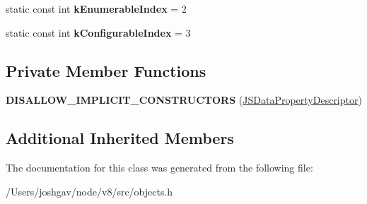 \begin{DoxyCompactItemize}
\item 
static const int {\bfseries k\+Enumerable\+Index} = 2\hypertarget{classv8_1_1internal_1_1_j_s_data_property_descriptor_aeb5380e3cefdc698ddcfc0613de24e29}{}\label{classv8_1_1internal_1_1_j_s_data_property_descriptor_aeb5380e3cefdc698ddcfc0613de24e29}

\item 
static const int {\bfseries k\+Configurable\+Index} = 3\hypertarget{classv8_1_1internal_1_1_j_s_data_property_descriptor_a8829176ac6384f9a0671c422cc69c8ab}{}\label{classv8_1_1internal_1_1_j_s_data_property_descriptor_a8829176ac6384f9a0671c422cc69c8ab}

\end{DoxyCompactItemize}
\subsection*{Private Member Functions}
\begin{DoxyCompactItemize}
\item 
{\bfseries D\+I\+S\+A\+L\+L\+O\+W\+\_\+\+I\+M\+P\+L\+I\+C\+I\+T\+\_\+\+C\+O\+N\+S\+T\+R\+U\+C\+T\+O\+RS} (\hyperlink{classv8_1_1internal_1_1_j_s_data_property_descriptor}{J\+S\+Data\+Property\+Descriptor})\hypertarget{classv8_1_1internal_1_1_j_s_data_property_descriptor_a1ece54d9a0de1ea8d5f2be5afaaca833}{}\label{classv8_1_1internal_1_1_j_s_data_property_descriptor_a1ece54d9a0de1ea8d5f2be5afaaca833}

\end{DoxyCompactItemize}
\subsection*{Additional Inherited Members}


The documentation for this class was generated from the following file\+:\begin{DoxyCompactItemize}
\item 
/\+Users/joshgav/node/v8/src/objects.\+h\end{DoxyCompactItemize}

